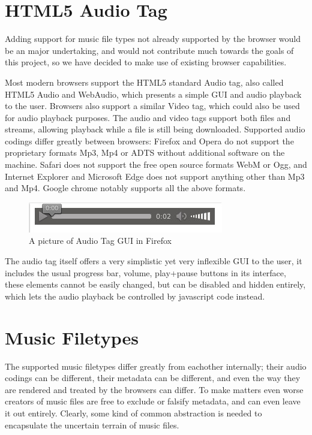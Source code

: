 \section{HTML5 Audio Tag}
\label{sec:HTML5_audio_tag}

Adding support for music file types not already supported by the browser 
would be an major undertaking, 
and would not contribute much towards the goals of this project, 
so we have decided to make use of existing browser capabilities.
\newline

Most modern browsers support the \acs{HTML}5 standard Audio tag,
also called \acs{HTML}5 Audio and WebAudio,
which presents a simple \acs{GUI} and audio playback to the user.
Browsers also support a similar Video tag, 
which could also be used for audio playback purposes.
The audio and video tags support both files and streams, 
allowing playback while a file is still being downloaded.
\newline
Supported audio codings differ greatly between browsers:
Firefox and Opera do not support the proprietary formats Mp3, Mp4 or ADTS
without additional software on the machine.
Safari does not support the free open source formats WebM or Ogg,
and Internet Explorer and Microsoft Edge does not support anything other than Mp3 and Mp4.
Google chrome notably supports all the above formats.
\newline

\begin{figure}[h]
  \centering
    \includegraphics[scale=0.5]{gfx/audioTag.jpg}
  \caption{A picture of Audio Tag GUI in Firefox}
  \label{fig:audiotag}
\end{figure}

The audio tag itself offers a very simplistic yet very inflexible \acs{GUI} to the user, 
it includes the usual progress bar, volume, play+pause buttons in its interface, 
these elements cannot be easily changed, but can be disabled and hidden entirely, 
which lets the audio playback be controlled by javascript code instead.
\newline

\section{Music Filetypes}
The supported music filetypes differ greatly from eachother internally; 
their audio codings can be different, their metadata can be different,
and even the way they are rendered and treated by the browsers can differ.
To make matters even worse creators of music files are free to exclude or falsify metadata, 
and can even leave it out entirely.
Clearly, some kind of common abstraction is needed to encapsulate the uncertain terrain of music files.
\newline


